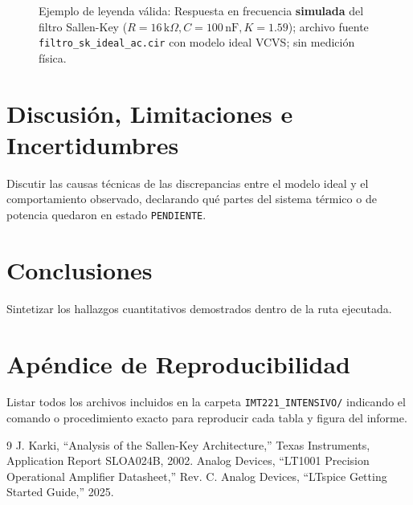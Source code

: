 \documentclass[conference, a4paper]{IEEEtran}
\begin{document}
\begin{figure}[htbp]
\centering
{}
\caption{Ejemplo de leyenda válida: Respuesta en frecuencia \textbf{simulada} del filtro Sallen-Key ($R=16\,\text{k}\Omega, C=100\,\text{nF}, K=1.59$); archivo fuente \texttt{filtro\_sk\_ideal\_ac.cir} con modelo ideal VCVS; sin medición física.}
\end{figure}

\section{Discusión, Limitaciones e Incertidumbres}
Discutir las causas técnicas de las discrepancias entre el modelo ideal y el comportamiento observado, declarando qué partes del sistema térmico o de potencia quedaron en estado \texttt{PENDIENTE}.

\section{Conclusiones}
Sintetizar los hallazgos cuantitativos demostrados dentro de la ruta ejecutada.

\section*{Apéndice de Reproducibilidad}
Listar todos los archivos incluidos en la carpeta \texttt{IMT221\_INTENSIVO/} indicando el comando o procedimiento exacto para reproducir cada tabla y figura del informe.

\begin{thebibliography}{9}
 J. Karki, ``Analysis of the Sallen-Key Architecture,'' Texas Instruments, Application Report SLOA024B, 2002.
 Analog Devices, ``LT1001 Precision Operational Amplifier Datasheet,'' Rev. C.
 Analog Devices, ``LTspice Getting Started Guide,'' 2025.
\end{thebibliography}
\end{document}
